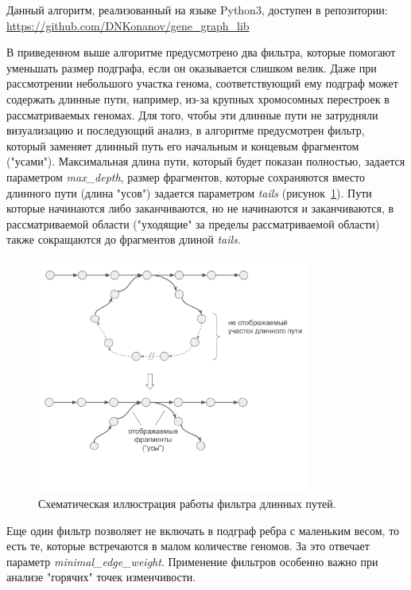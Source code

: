 Данный алгоритм, реализованный на языке Python3, доступен в репозитории: \url{https://github.com/DNKonanov/gene_graph_lib}

В приведенном выше алгоритме предусмотрено два фильтра, которые помогают уменьшать размер подграфа, если он оказывается слишком велик.  Даже при рассмотрении небольшого участка генома, соответствующий ему подграф может содержать длинные пути, например, из-за крупных хромосомных перестроек в рассматриваемых геномах. Для того, чтобы эти длинные пути не затрудняли визуализацию и последующий анализ, в алгоритме предусмотрен фильтр, который заменяет длинный путь его начальным и концевым фрагментом ("усами"). Максимальная длина пути, который будет показан полностью, задается параметром \textit{max\_depth}, размер фрагментов, которые сохраняются вместо длинного пути (длина "усов") задается параметром \textit{tails} (рисунок~\ref{img:tails_schema}). Пути которые начинаются либо заканчиваются, но не начинаются и заканчиваются, в рассматриваемой области ("уходящие" за пределы рассматриваемой области) также сокращаются до фрагментов длиной \textit{tails}.

\begin{figure}[!ht] 
  \center
  \includegraphics[width=0.8\textwidth]{Dissertation/images/subgraphs/tails_schema_v2.png}
  \caption{Схематическая иллюстрация работы фильтра длинных путей. }
  \label{img:tails_schema} 
\end{figure}

Еще один фильтр позволяет не включать в подграф ребра с маленьким весом, то есть те, которые встречаются в малом количестве геномов. За это отвечает параметр \textit{minimal\_edge\_weight}. Применение фильтров особенно важно при анализе "горячих" точек изменчивости.

